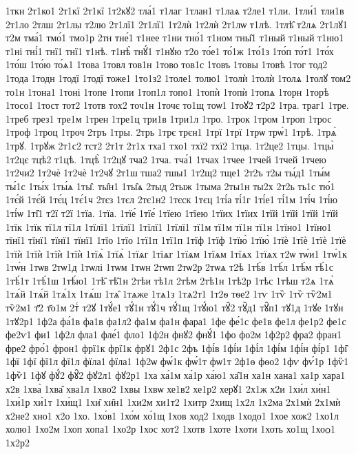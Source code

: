 {1ткн
2т1ко1
2т1кї
2т1кї
1т2кꙋ2
тла́1
т1лаг
1тлан1
т1лаѧ
т2ле1
т1ли.
1тли́1
тли1в
2т1ло
2тлш
2т1лы
т2лю
2т1лї1
2т1лї1
1т2лѝ
1т2лѝ
2т1лѡ
т1лѣ.
1тлѣ̑
т2лѧ
2т1лꙋ1
т2м
тма́1
тмо́1
тмо1р
2тн
тне́1
т1нее
т1ни
тно́1
т1ном
тны̑1
т1ный
т1ный
т1ню1
т1ні
тні́1
тнї1
тнї1
т1нѣ.
т1нѣ̀
тнꙋ́1
т1нꙋю
т2о
то́е1
то́1ж
1то́1з
1то́п
то́т1
1то́х
1то́ш
1то́ю
то́ѧ1
1това
1товл
тов1н
1тово
тов1с
1товъ
1товы
1товѣ
1тог
тод2
1тода
1тодн
1тодї
1тодї
тоже1
1то1з2
1толе1
толю1
1толѝ
1толѝ
1толѧ
1толꙋ
том2
то1н
1тона1
1тоні
1топе
1топи
1топ1л
топо1
1топѝ
1топѝ
1топѧ
1торн
1торѣ
1тосо1
1тост
тот2
1тотв
тох2
точ1н
1точє
то1щ
тоѡ1
1тоꙋ2
т2р2
1тра.
траг1
1тре.
1треб
трез1
тре1м
1трен
1тре1ц
три1в
1три1л
1тро.
1трок
1тром
1троп
1трос
1троф
1троц
1троч
2тръ
1тры.
2трь
1трє
трєн1
1трї
1трї
1трѡ
трѡ́1
1трѣ.
1трѧ̀
1трꙋ.
1трꙋж
2т1с2
тст2
2т1т
2т1х
тха1
тхо1
тхї2
тхї2
1тца.
1т2це2
1тцы.
1тцы̀
1т2цє
тцѣ2
т1цѣ.
1тцѣ̀
1т2цꙋ
тча2
1тча.
тча́1
1тчах
1тчее
1тчей
1тчей
1тчею
1т2чи2
1т2чѐ
1т2чѐ
1т2чꙋ
2т1ш
тша2
тшы1
1т2щ2
тще1
2т2ъ
т2ы
ты́д1
1ты́м
ты́1с
1ты́х
1ты́ѧ
1ты̑.
ты̑н1
1ты̑ѧ
2тыд
2тыж
1тыма
2ты1н
ты2х
2т2ь
ть1с
тю́1
1тє́й
1тє́й
1тє́ц
1тє́1ч
2тєз
1тєл
2тє1н2
1тєск
1тєц
1ті́а
ті́1г
1ті́е1
ті́1м
1ті́ч
1ті́ю
1ті́ѡ
1ті̑1
т2ї
т2ї
1тїа.
1тїа.
1тїе́
1тїе́
1тїею
1тїею
1тїих
1тїих
1тїй
1тїй
1тїй
1тїй
1тїк
1тїк
тї1л
тї1л
1тїлї1
1тїлї1
1тїлї1
1тїлї1
тї1м
тї1м
тї1н
тї1н
1тїно1
1тїно1
тїнї1
тїнї1
тїнї1
тїнї1
1тїо
1тїо
1тї1п
1тї1п
1тїф
1тїф
1тїю̀
1тїю̀
1тїѐ
1тїѐ
1тїѐ
1тїѐ
1тїѝ
1тїѝ
1тїѝ
1тїѝ
1тїѧ̀
1тїѧ̀
1тїѧг
1тїѧг
1тїѧм
1тїѧм
1тїѧх
1тїѧх
т2ѡ
тѡ́и1
1тѡ́1к
1тѡ́н
1тѡв
2тѡ1д
1тѡлі
1тѡм
1тѡн
2тѡп
2тѡ2р
2тѡѧ
т2ѣ
1тѣ́в
1тѣ́л
1тѣ́м
тѣ́1с
1тѣ́1т
1тѣ́1ш
1тѣ́ю1
1тѣ̑
тѣ̑1н
2тѣи
тѣ1л
2тѣм
2тѣ1н
1тѣ2р
1тѣс
1тѣш
т2ѧ
1тѧ̀
1тѧ́й
1тѧ́й
1тѧ́1х
1тѧ́ш
1тѧ̑
1тѧже
1тѧ1з
1тѧ2т1
1т2ѳ
тѳе2
1тѵ
1тѷ
1тѷ
тѷ2м1
тѷ2м1
т҃2
т҃о1м
2тⷭ
т2ꙋ
1тꙋ́е1
тꙋ́1н
тꙋ́1ч
тꙋ́1щ
1тꙋ́ю1
тꙋ̑2
тꙋ̑д1
тꙋ̑п1
тꙋ1д
1тꙋе
1тꙋн
1тꙋ2р1
1ф2а
фа́1в
фа1в
фа1л2
фа1м
фа1н
фара1
1фе
фе́1с
фе1в
фе1л
фе1р2
фе1с
фе2ѵ1
фи1
1ф2л
фла1
фле́1
фло1
1ф2н
фнꙋ2
фнꙋ́1
1фо
фо2м
1ф2р2
фра2
фран1
фре2
фро́1
фрон1
фрї1к
фрї1к
фрꙋ1
2ф1с
2фъ
1фі́в
1фі́и
1фі́л
1фі́м
1фі́н
фі́р1
1фі̑
1фї
1фї
фї1л
фї1л
фїла1
фїла1
1ф2ѡ
фѡ́1к
фѡ́1т
фѡ1т
2ф1ѳ
фѳо2
1фѵ
фѵ́1р
1фѷ1
1фѷ1
1фꙋ
фꙋ́2
фꙋ̑2
фꙋ2л1
фꙋ2р1
1ха
ха́1м
ха́1р
ха́ю1
ха̑1н
ха1н
хана1
ха1р
хара1
х2в
1хва̀
1хва̑
хва1л
1хво2
1хвы
1хвѡ
хе1в2
хе1р2
херꙋ1
2х1ж
х2и
1хи́л
хи́н1
1хи́1р
хи́1т
1хи́щ1
1хи̑
хи̑н1
1хи2м
хи1т2
1хитр
2хищ
1х2л
1х2ма
2х1мѝ
2х1мѝ
х2не2
хно1
х2о
1хо.
1хо́в1
1хо́м
хо́1щ
1хов
ход2
1ходв
1ходо1
1хое
хож2
1хо1л
холю1
1хо2м
1хоп
хопа1
1хо2р
1хос
хот2
1хотв
1хоте
1хоти
1хоть
хо1щ
1хоѻ1
1х2р2
}
